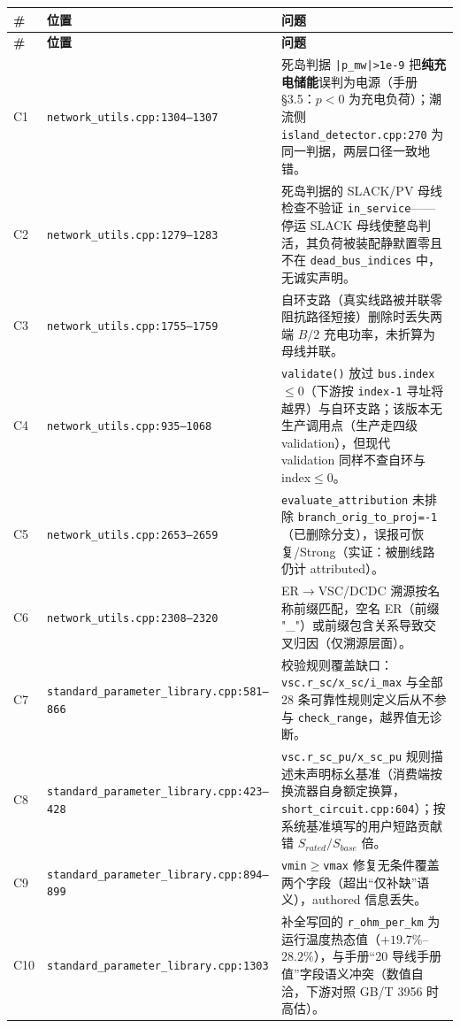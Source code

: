 \documentclass[11pt,a4paper,fontset=fandol]{ctexart}
\newcommand{\file}[1]{\texttt{#1}}
\begin{document}
\begin{footnotesize}
\begin{longtable}{@{}p{0.7cm}p{5.2cm}p{9.3cm}@{}}
\toprule
\textbf{\#} & \textbf{位置} & \textbf{问题}\\
\midrule
\endfirsthead
\toprule
\textbf{\#} & \textbf{位置} & \textbf{问题}\\
\midrule
\endhead
C1 & \file{network\_utils.cpp:1304--1307} & 死岛判据 \texttt{|p\_mw|>1e-9} 把\textbf{纯充电储能}误判为电源（手册 \S 3.5：$p<0$ 为充电负荷）；潮流侧 \file{island\_detector.cpp:270} 为同一判据，两层口径一致地错。\\
C2 & \file{network\_utils.cpp:1279--1283} & 死岛判据的 SLACK/PV 母线检查不验证 \texttt{in\_service}——停运 SLACK 母线使整岛判活，其负荷被装配静默置零且不在 \texttt{dead\_bus\_indices} 中，无诚实声明。\\
C3 & \file{network\_utils.cpp:1755--1759} & 自环支路（真实线路被并联零阻抗路径短接）删除时丢失两端 $B/2$ 充电功率，未折算为母线并联。\\
C4 & \file{network\_utils.cpp:935--1068} & \texttt{validate()} 放过 \texttt{bus.index}$\le 0$（下游按 \texttt{index-1} 寻址将越界）与自环支路；该版本无生产调用点（生产走四级 validation），但现代 validation 同样不查自环与 index$\le 0$。\\
C5 & \file{network\_utils.cpp:2653--2659} & \texttt{evaluate\_attribution} 未排除 \texttt{branch\_orig\_to\_proj=-1}（已删除分支），误报可恢复/Strong（实证：被删线路仍计 attributed）。\\
C6 & \file{network\_utils.cpp:2308--2320} & ER$\to$VSC/DCDC 溯源按名称前缀匹配，空名 ER（前缀 "\_"）或前缀包含关系导致交叉归因（仅溯源层面）。\\
C7 & \file{standard\_parameter\_library.cpp:}\newline\file{581--866} & 校验规则覆盖缺口：\texttt{vsc.r\_sc/x\_sc/i\_max} 与全部 28 条可靠性规则定义后从不参与 \texttt{check\_range}，越界值无诊断。\\
C8 & \file{standard\_parameter\_library.cpp:}\newline\file{423--428} & \texttt{vsc.r\_sc\_pu/x\_sc\_pu} 规则描述未声明标幺基准（消费端按换流器自身额定换算，\file{short\_circuit.cpp:604}）；按系统基准填写的用户短路贡献错 $S_{rated}/S_{base}$ 倍。\\
C9 & \file{standard\_parameter\_library.cpp:}\newline\file{894--899} & \texttt{vmin$\ge$vmax} 修复无条件覆盖两个字段（超出``仅补缺''语义），authored 信息丢失。\\
C10 & \file{standard\_parameter\_library.cpp:}\newline\file{1303} & 补全写回的 \texttt{r\_ohm\_per\_km} 为运行温度热态值（$+19.7\%$--$28.2\%$），与手册``20 \textcelsius{} 导线手册值''字段语义冲突（数值自洽，下游对照 GB/T 3956 时高估）。\\

\end{longtable}
\end{footnotesize}
\end{document}
